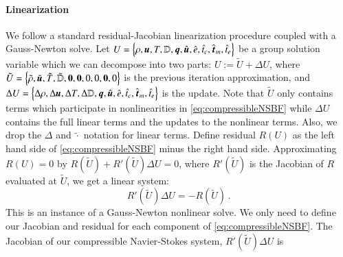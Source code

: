 \documentclass[preprint,12pt]{elsarticle}
\begin{document}
\paragraph{Linearization}
We follow a standard residual-Jacobian linearization procedure coupled with a Gauss-Newton solve.
Let $U=\left\{ \rho,\boldsymbol u,T,\mathbb{D},\boldsymbol q,\hat{\boldsymbol u},\hat e,\hat t_c,\hat{\boldsymbol t}_m,\hat t_e \right\}$ be a group solution variable which we can decompose into two parts:
$U:=\tilde U+\Delta U$, where
$\tilde U = \left\{ \tilde\rho,\tilde{\boldsymbol u},\tilde T,\tilde{\mathbb{D}},\boldsymbol{0},\boldsymbol{0},0,0,\boldsymbol{0},0 \right\}$ is the previous iteration approximation, 
and $\Delta U=\left\{ \Delta\rho,\Delta\boldsymbol u,\Delta T,\Delta\mathbb{D},\boldsymbol q,\hat{\boldsymbol u},\hat e,\hat t_c,\hat{\boldsymbol t}_m,\hat t_e \right\}$ is the update.
Note that $\tilde U$ only contains terms which participate in nonlinearities in \eqref{eq:compressibleNSBF} 
while $\Delta U$ contains the full linear terms and the updates to the nonlinear terms.
Also, we drop the $\Delta$ and $\tilde\cdot$ notation for linear terms.
Define residual $R(U)$ as the left hand side of \eqref{eq:compressibleNSBF} minus the right hand side.
Approximating $R(U)=0$ by $R(\tilde U)+R'(\tilde U)\Delta U=0$, where $R'(\tilde U)$ is the Jacobian of $R$ evaluated at $\tilde U$, we get a linear system:
\begin{equation}
	R'(\tilde U)\Delta U=-R(\tilde U)\,.
\end{equation}
This is an instance of a Gauss-Newton nonlinear solve.
We only need to define our Jacobian and residual for each component of \eqref{eq:compressibleNSBF}. 
The Jacobian of our compressible Navier-Stokes system, $R'(\tilde U)\Delta U$ is
\scriptsize
\end{document}
